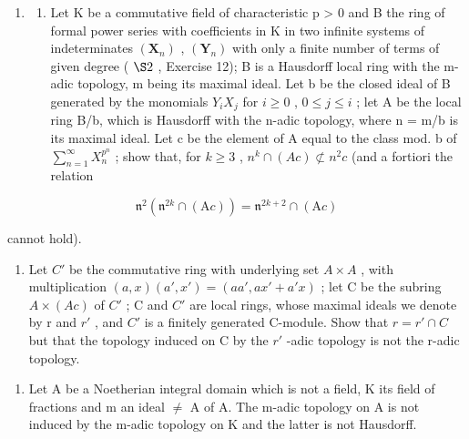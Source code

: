 
\begin{enumerate}
\def\labelenumi{\arabic{enumi}.}
\tightlist
\item
  \begin{enumerate}
  \def\labelenumii{(\alph{enumii})}
  \tightlist
  \item
    Let K be a commutative field of characteristic p \textgreater{} 0 and B the ring of formal power series with coefficients in K in two infinite systems of indeterminates \((\mathbf{X}_{n})\) , \((\mathbf{Y}_{n})\) with only a finite number of terms of given degree ( \(\S 2\) , Exercise 12); B is a Hausdorff local ring with the m-adic topology, m being its maximal ideal. Let b be the closed ideal of B generated by the monomials \(Y_{i}X_{j}\) for \(i \geqslant 0\) , \(0 \leqslant j \leqslant i\) ; let A be the local ring B/b, which is Hausdorff with the n-adic topology, where n = m/b is its maximal ideal. Let c be the element of A equal to the class mod. b of \(\sum_{n=1}^{\infty} X_{n}^{p^{n}}\) ; show that, for \(k \geqslant 3\) , \(n^{k} \cap (Ac) \not\subset n^{2}c\) (and a fortiori the relation
  \end{enumerate}
\end{enumerate}

\[
\mathfrak {n} ^ {2} (\mathfrak {n} ^ {2 k} \cap (\mathrm{A} c)) = \mathfrak {n} ^ {2 k + 2} \cap (\mathrm{A} c)
\]

cannot hold).

\begin{enumerate}
\def\labelenumi{(\alph{enumi})}
\setcounter{enumi}{1}
\tightlist
\item
  Let \(C'\) be the commutative ring with underlying set \(A \times A\) , with multiplication \((a, x)(a', x') = (aa', ax' + a'x)\) ; let C be the subring \(A \times (Ac)\) of \(C'\) ; C and \(C'\) are local rings, whose maximal ideals we denote by r and \(r'\) , and \(C'\) is a finitely generated C-module. Show that \(r = r' \cap C\) but that the topology induced on C by the \(r'\) -adic topology is not the r-adic topology.
\end{enumerate}

\begin{enumerate}
\def\labelenumi{\arabic{enumi}.}
\setcounter{enumi}{1}
\tightlist
\item
  Let A be a Noetherian integral domain which is not a field, K its field of fractions and m an ideal \(\neq\) A of A. The m-adic topology on A is not induced by the m-adic topology on K and the latter is not Hausdorff.
\end{enumerate}

